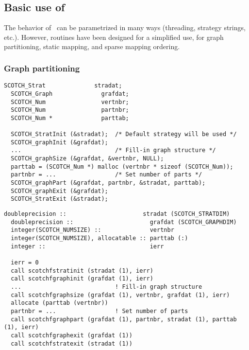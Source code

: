 \begin{center}
\end{center}

\subsection{Basic use of \scotch}

The behavior of \scotch\ can be parametrized in many ways (threading,
strategy strings, etc.). However, routines have been designed for a
simplified use, for graph partitioning, static mapping, and sparse
mapping ordering.

\subsubsection{Graph partitioning}

\begin{lstlisting}[style=language-c]
  SCOTCH_Strat              stradat;
  SCOTCH_Graph              grafdat;
  SCOTCH_Num                vertnbr;
  SCOTCH_Num                partnbr;
  SCOTCH_Num *              parttab;

  SCOTCH_StratInit (&stradat);  /* Default strategy will be used */
  SCOTCH_graphInit (&grafdat);
  ...                           /* Fill-in graph structure */
  SCOTCH_graphSize (&grafdat, &vertnbr, NULL);
  parttab = (SCOTCH_Num *) malloc (vertnbr * sizeof (SCOTCH_Num));
  partnbr = ...                 /* Set number of parts */
  SCOTCH_graphPart (&grafdat, partnbr, &stradat, parttab);
  SCOTCH_graphExit (&grafdat);
  SCOTCH_StratExit (&stradat);
\end{lstlisting}

\begin{lstlisting}[style=language-f]
  doubleprecision ::                      stradat (SCOTCH_STRATDIM)
  doubleprecision ::                      grafdat (SCOTCH_GRAPHDIM)
  integer(SCOTCH_NUMSIZE) ::              vertnbr
  integer(SCOTCH_NUMSIZE), allocatable :: parttab (:)
  integer ::                              ierr

  ierr = 0
  call scotchfstratinit (stradat (1), ierr)
  call scotchfgraphinit (grafdat (1), ierr)
  ...                           ! Fill-in graph structure
  call scotchfgraphsize (grafdat (1), vertnbr, grafdat (1), ierr)
  allocate (parttab (vertnbr))
  partnbr = ...                 ! Set number of parts
  call scotchfgraphpart (grafdat (1), partnbr, stradat (1), parttab (1), ierr)
  call scotchfgraphexit (grafdat (1))
  call scotchfstratexit (stradat (1))
\end{lstlisting}

